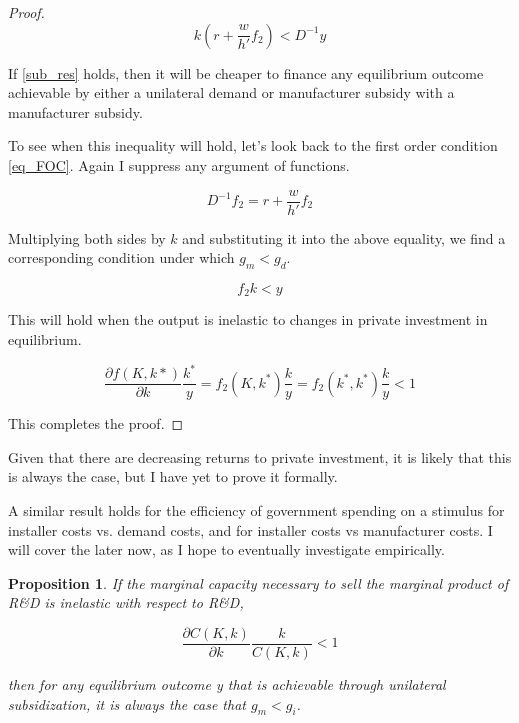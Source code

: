 \documentclass{article}
\newtheorem{proposition}{Proposition}
\begin{document}
\begin{proof}
\begin{equation}
k \left( r + \frac{w}{h'} f_2 \right) < D^{-1} y
\label{sub_res}
\end{equation}

If \ref{sub_res} holds, then it will be cheaper to finance any equilibrium outcome achievable by either a unilateral demand or manufacturer subsidy with a manufacturer subsidy.

To see when this inequality will hold, let's look back to the first order condition \ref{eq_FOC}. Again I suppress any argument of functions.

\[
D^{-1} f_2 = r + \frac{w}{h'} f_2 
\]

Multiplying both sides by $k$ and substituting it into the above equality, we find a corresponding condition under which $g_m < g_d$.

\[
 f_2 k < y
\]

This will hold when the output is inelastic to changes in private investment in equilibrium.

 \[
 \frac{\partial f(K,k*)}{\partial k} \frac{k^*}{y} = f_2(K,k^*) \frac{k}{y} =  f_2(k^*,k^*) \frac{k}{y} <  1
 \]

This completes the proof.
\end{proof}

Given that there are decreasing returns to private investment, it is likely that this is always the case, but I have yet to prove it formally.

A similar result holds for the efficiency of government spending on a stimulus for installer costs vs. demand costs, and for installer costs vs manufacturer costs. I will cover the later now, as I hope to eventually investigate empirically.

\begin{proposition}
If the marginal capacity necessary to sell the marginal product of R\&D is inelastic with respect to R\&D, 

\[
\frac{\partial C(K,k)}{\partial k} \frac{k}{C(K,k)}  <  1
\]

then for any equilibrium outcome y that is achievable through unilateral subsidization, it is always the case that $g_m < g_i$.
\end{proposition}
\end{document}
